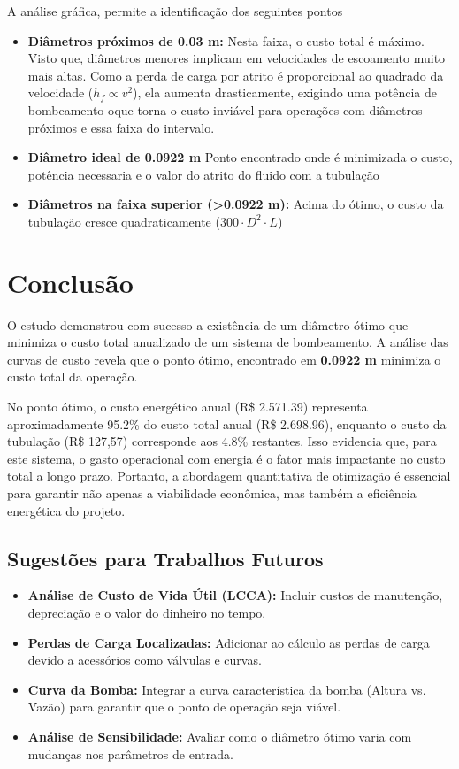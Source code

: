 \documentclass[12pt, a4paper]{article}
\begin{document}
            A análise gráfica, permite a identificação dos seguintes pontos
            \begin{itemize}
                \item \textbf{Diâmetros próximos de 0.03 m:} Nesta faixa, o custo total é máximo. Visto que, diâmetros menores implicam em velocidades de escoamento muito mais altas. Como a perda de carga por atrito é proporcional ao quadrado da velocidade ($h_f \propto v^2$), ela aumenta drasticamente, exigindo uma potência de bombeamento oque torna o custo inviável para operações com diâmetros próximos e essa faixa do intervalo.
                \item \textbf{Diâmetro ideal de 0.0922 m} Ponto encontrado onde é minimizada o custo, potência necessaria e o valor do atrito do fluido com a tubulação
                \item \textbf{Diâmetros na faixa superior (>0.0922 m):}  Acima do ótimo, o custo da tubulação cresce quadraticamente ($300 \cdot D^2 \cdot L$)
            \end{itemize}

    \section{Conclusão}
        O estudo demonstrou com sucesso a existência de um diâmetro ótimo que minimiza o custo total anualizado de um sistema de bombeamento. A análise das curvas de custo revela que o ponto ótimo, encontrado em \textbf{0.0922 m} minimiza o custo total da operação.

        No ponto ótimo, o custo energético anual (R\$ 2.571.39) representa aproximadamente 95.2\% do custo total anual (R\$ 2.698.96), enquanto o custo da tubulação (R\$ 127,57) corresponde aos 4.8\% restantes. Isso evidencia que, para este sistema, o gasto operacional com energia é o fator mais impactante no custo total a longo prazo. Portanto, a abordagem quantitativa de otimização é essencial para garantir não apenas a viabilidade econômica, mas também a eficiência energética do projeto.


        \subsection*{Sugestões para Trabalhos Futuros}
            \begin{itemize}
                \item \textbf{Análise de Custo de Vida Útil (LCCA):} Incluir custos de manutenção, depreciação e o valor do dinheiro no tempo.
                \item \textbf{Perdas de Carga Localizadas:} Adicionar ao cálculo as perdas de carga devido a acessórios como válvulas e curvas.
                \item \textbf{Curva da Bomba:} Integrar a curva característica da bomba (Altura vs. Vazão) para garantir que o ponto de operação seja viável.
                \item \textbf{Análise de Sensibilidade:} Avaliar como o diâmetro ótimo varia com mudanças nos parâmetros de entrada.
            \end{itemize}
    
\end{document}
